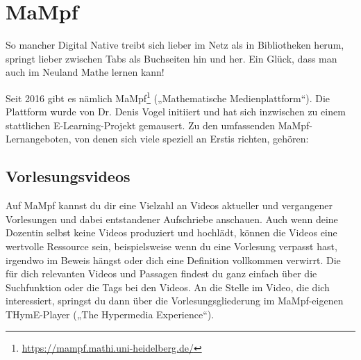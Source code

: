 
\section{MaMpf}
\label{mampf}

\noindent So mancher Digital Native treibt sich lieber im Netz als in Bibliotheken herum, springt lieber zwischen Tabs als Buchseiten hin und her. Ein Glück, dass man auch im Neuland Mathe lernen kann!

\begin{figure}
\vspace{-3mm} %
\hspace*{-7mm}
\end{figure}

Seit 2016 gibt es nämlich MaMpf\footnote{\url{https://mampf.mathi.uni-heidelberg.de/}} („Mathematische Medienplattform“). Die Plattform wurde von Dr. Denis Vogel initiiert und hat sich inzwischen zu einem stattlichen E-Learning-Projekt gemausert. Zu den umfassenden MaMpf-Lernangeboten, von denen sich viele speziell an Erstis richten, gehören: 
 
\subsection{Vorlesungsvideos}
Auf MaMpf kannst du dir eine Vielzahl an Videos aktueller und vergangener Vorlesungen und dabei entstandener Aufschriebe anschauen. Auch wenn deine Dozentin selbst keine Videos produziert und hochlädt, können die Videos eine wertvolle Ressource sein, beispielsweise wenn du eine Vorlesung verpasst hast, irgendwo im Beweis hängst oder dich eine Definition vollkommen verwirrt. Die für dich relevanten Videos und Passagen findest du ganz einfach über die Suchfunktion oder die Tags bei den Videos. An die Stelle im Video, die dich interessiert, springst du dann über die Vorlesungsgliederung im MaMpf-eigenen THymE-Player („The Hypermedia Experience“).

